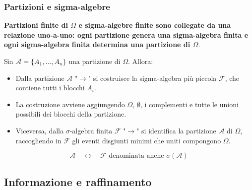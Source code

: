 \documentclass[handout]{beamer}%
\newenvironment{stepitemize}{\begin{itemize}[<+->]}{\end{itemize} }
\providecommand{\F}{\mathcal{F}}
\providecommand{\1}{\mathbf{1}}
\providecommand{\QTR}[2]{\csname #1\endcsname{#2}}
\begin{document}
\begin{frame}%
%

\frametitle{Partizioni e sigma-algebre}%


\textbf{Partizioni finite di $\Omega$ e sigma-algebre finite sono collegate da
una relazione uno-a-uno: ogni partizione genera una sigma-algebra finita e
ogni sigma-algebra finita determina una partizione di $\Omega$}.

\medskip

Sia $\mathcal{A}=\{A_{1},\ldots,A_{n}\}$ una partizione di $\Omega$. Allora:

\begin{stepitemize}


\item Dalla partizione $\mathcal{A}$ "$\rightarrow$" si costruisce la
sigma-algebra pi\`{u} piccola $\F$, che contiene tutti i blocchi $A_{i}$.

\item La costruzione avviene aggiungendo $\Omega$, $\emptyset$, i complementi
e tutte le unioni possibili dei blocchi della partizione.

\item Viceversa, dalla $\sigma$-algebra finita $\F$ "$\rightarrow$" si
identifica la partizione $\mathcal{A}$ di $\Omega$, raccogliendo in $\F$ gli
eventi disgiunti minimi che uniti compongono $\Omega$.
\end{stepitemize}

\medskip%

\[
\mathcal{A }\quad\longleftrightarrow\quad\F \text{ denominata anche }
\sigma(\mathcal{A})
\]
%

\transboxout
\end{frame}%




\subsection{Informazione e raffinamento}%
\end{document}
